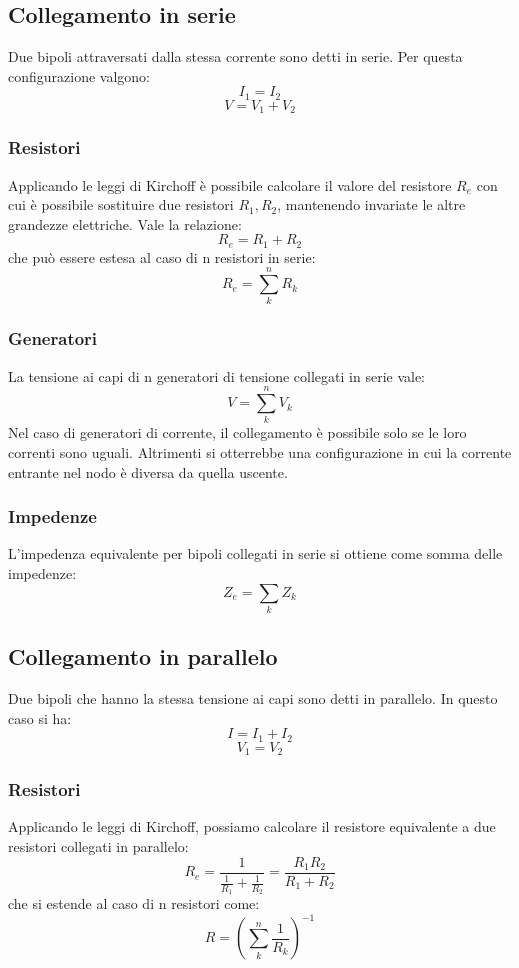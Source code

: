 \documentclass{article}
\begin{document}
\subsection{Collegamento in serie}
Due bipoli attraversati dalla stessa corrente sono detti in serie.
Per questa configurazione valgono:
$$ I_1=I_2 $$
$$ V=V_1+V_2 $$

\subsubsection{Resistori}
Applicando le leggi di Kirchoff è possibile calcolare il valore del resistore $R_e$ con cui è possibile sostituire due resistori $R_1,R_2$, mantenendo invariate le altre grandezze elettriche. Vale la relazione:
$$ R_e=R_1+R_2 $$
che può essere estesa al caso di n resistori in serie:
$$ R_e=\sum_k^nR_k $$

\subsubsection{Generatori}
La tensione ai capi di n generatori di tensione collegati in serie vale:
$$ V=\sum_k^nV_k $$
Nel caso di generatori di corrente, il collegamento è possibile solo se le loro correnti sono uguali. Altrimenti si otterrebbe una configurazione in cui la corrente entrante nel nodo è diversa da quella uscente.

\subsubsection{Impedenze}
L'impedenza equivalente per bipoli collegati in serie si ottiene come somma delle impedenze:
$$ Z_e = \sum_k Z_k $$


\subsection{Collegamento in parallelo}
Due bipoli che hanno la stessa tensione ai capi sono detti in parallelo.
In questo caso si ha:
$$ I=I_1+I_2 $$
$$ V_1=V_2 $$

\subsubsection{Resistori}
Applicando le leggi di Kirchoff, possiamo calcolare il resistore equivalente a due resistori collegati in parallelo:
$$ R_e= \frac{1}{\frac{1}{R_1}+\frac{1}{R_2}}=\frac{R_1R_2}{R_1+R_2}$$
che si estende al caso di n resistori come:
$$ R=\left(\sum_k^n\frac{1}{R_k}\right)^{-1}$$
\end{document}
